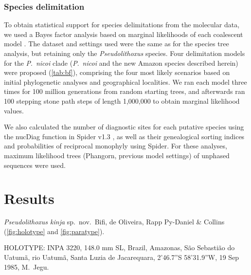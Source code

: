 \documentclass[12pt]{article}
\begin{document}
\subsubsection*{Species delimitation}

To obtain statistical support for species delimitations from the molecular data, we used a Bayes factor analysis based on marginal likelihoods of each coalescent model \citep{Fujita2012,Grummer2014}. %
The dataset and settings used were the same as for the species tree analysis, but retaining only the \emph{Pseudolithoxus} species. %
Four delimitation models for the \emph{P}.\ \emph{nicoi} clade (\emph{P}.\ \emph{nicoi} and the new Amazon species described herein) were proposed (\autoref{tab:bf}), comprising the four most likely scenarios based on initial phylogenetic analyses and geographical localities. %
We ran each model three times for 100 million generations from random starting trees, and afterwards ran 100 stepping stone \citep{Xie2011} path steps of length 1,000,000 to obtain marginal likelihood values.%

We also calculated the number of diagnostic sites for each putative species using the nucDiag function in Spider v1.3 \citep{Brown2012}, as well as their genealogical sorting indices \citep[genealogicalSorting v0.92;][]{Cummings2008} and probabilities of reciprocal monophyly \citep{Rosenberg2007} using Spider. %
For these analyses, maximum likelihood trees (Phangorn, previous model settings) of unphased sequences were used.%


\section*{Results}

\emph{Pseudolithoxus kinja} sp.\ nov.\ Bifi, de Oliveira, Rapp Py-Daniel \& Collins \\(\autoref{fig:holotype} and \autoref{fig:paratype}).\\
\bigskip

\noindent HOLOTYPE: INPA 3220, 148.0 mm SL, Brazil, Amazonas, São Sebastião do Uatumã, rio Uatumã, Santa Luzia de Jacarequara, 2’46.7”S 58’31.9”W, 19 Sep 1985, M.\ Jegu.\\%
\bigskip
\end{document}
